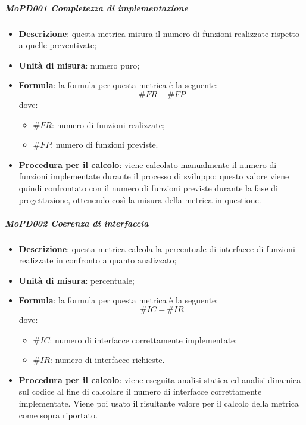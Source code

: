 \documentclass[../norme-di-progetto.tex]{subfiles}
\begin{document}
\subparagraph{MoPD001 Completezza di implementazione}
\begin{itemize}
  \item \textbf{Descrizione}: questa metrica misura il numero di funzioni realizzate rispetto a quelle preventivate;
  \item \textbf{Unità di misura}: numero puro;
  \item \textbf{Formula}: la formula per questa metrica è la seguente:
  \begin{displaymath}
    \#FR - \#FP
  \end{displaymath}
  dove:
  \begin{itemize}
    \item $ \#FR $: numero di funzioni realizzate;
    \item $ \#FP $: numero di funzioni previste.
  \end{itemize}
  \item \textbf{Procedura per il calcolo}: viene calcolato manualmente il numero di funzioni implementate durante il processo di sviluppo; questo valore viene quindi confrontato con il numero di funzioni previste durante la fase di progettazione, ottenendo così la misura della metrica in questione.
\end{itemize}

\subparagraph{MoPD002 Coerenza di interfaccia}
\begin{itemize}
  \item \textbf{Descrizione}: questa metrica calcola la percentuale di interfacce di funzioni realizzate in confronto a quanto analizzato;
  \item \textbf{Unità di misura}: percentuale;
  \item \textbf{Formula}: la formula per questa metrica è la seguente:
  \begin{displaymath}
    \#IC - \#IR
  \end{displaymath}
  dove:
  \begin{itemize}
    \item $ \#IC $: numero di interfacce correttamente implementate;
    \item $ \#IR $: numero di interfacce richieste.
  \end{itemize}
  \item \textbf{Procedura per il calcolo}: viene eseguita analisi statica ed analisi dinamica sul codice al fine di calcolare il numero di interfacce correttamente implementate. Viene poi usato il risultante valore per il calcolo della metrica come sopra riportato.
\end{itemize}
\end{document}
